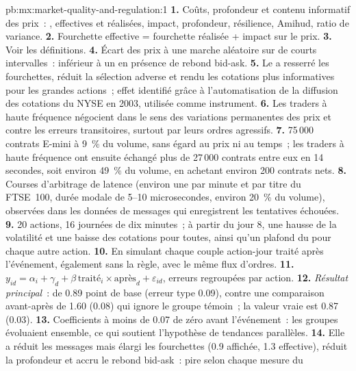 \begin{solution}{pb:mx:market-quality-and-regulation:1}
\textbf{1.} Coûts, profondeur et contenu informatif des prix~: , effectives et réalisées, impact, profondeur, résilience, Amihud, ratio de variance.
\textbf{2.} Fourchette effective = fourchette réalisée + impact sur le prix.
\textbf{3.} Voir les définitions.
\textbf{4.} Écart des prix à une marche aléatoire sur de courts intervalles~: inférieur à un en présence de rebond bid-ask.
\textbf{5.} Le  a resserré les fourchettes, réduit la sélection adverse et rendu les cotations plus informatives pour les grandes actions~; effet identifié grâce à
l'automatisation de la diffusion des cotations du NYSE en 2003, utilisée comme instrument.
\textbf{6.} Les traders à haute fréquence négocient dans le sens des variations permanentes des prix et contre les erreurs transitoires, surtout par leurs ordres agressifs.
\textbf{7.} 75\,000 contrats E-mini à 9~\% du volume, sans égard au prix ni au temps~; les traders à haute fréquence ont ensuite échangé plus de 27\,000 contrats entre
eux en 14 secondes, soit environ 49~\% du volume, en achetant environ 200 contrats nets.
\textbf{8.} Courses d'arbitrage de latence (environ une par minute et par titre du FTSE~100, durée modale de 5--10 microsecondes, environ 20~\% du volume), observées dans les données de messages
qui enregistrent les tentatives échouées.
\textbf{9.} 20 actions, 16 journées de dix minutes~; à partir du jour 8, une hausse de la volatilité et une baisse des cotations pour toutes, ainsi qu'un plafond du  pour
chaque autre action.
\textbf{10.} En simulant chaque couple action-jour traité après l'événement, également sans la règle, avec le même flux d'ordres.
\textbf{11.} $y_{id}=\alpha_i+\gamma_d+\beta\,\text{traité}_i\times\text{après}_d+\varepsilon_{id}$, erreurs regroupées par action.
\textbf{12.} \emph{Résultat principal}~:  de 0.89 point de base (erreur type 0.09), contre une comparaison avant-après de 1.60 (0.08) qui ignore
le groupe témoin~; la valeur vraie est 0.87 (0.03).
\textbf{13.} Coefficients à moins de 0.07 de zéro avant l'événement~: les groupes évoluaient ensemble, ce qui soutient l'hypothèse de tendances parallèles.
\textbf{14.} Elle a réduit les messages mais élargi les fourchettes (0.9 affichée, 1.3 effective), réduit la profondeur et accru le rebond bid-ask~: pire selon chaque mesure du

\end{solution}
